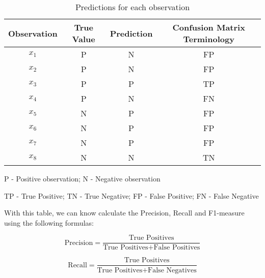 \documentclass[12pt]{article}
\begin{document}
\begin{enumerate}[leftmargin=\labelsep]
    \begin{table}[H]
        \begin{center}
            \begin{threeparttable}
            \begin{tabular}{c|c|c|c}
                Observation & True Value & Prediction & Confusion Matrix Terminology\\
                \hline
                $x_1$ & P & N & FP\\
                $x_2$ & P & N & FP\\
                $x_3$ & P & P & TP\\
                $x_4$ & P & N & FN\\
                $x_5$ & N & P & FP\\
                $x_6$ & N & P & FP\\
                $x_7$ & N & P & FP\\
                $x_8$ & N & N & TN\\
            \end{tabular}
            \begin{tablenotes}
                \small
                \item[]
                \item[P - Positive observation; N - Negative observation]  
                \item[TP - True Positive; TN - True Negative; FP - False Positive; FN - False Negative] 
                \item[] 
            \end{tablenotes}
        \end{threeparttable}
            \caption{Predictions for each observation}
        \end{center}
    \end{table}

    With this table, we can know calculate the Precision, Recall and F1-measure using the following formulas:

    \begin{equation}\label{precision}
        \text{Precision} = \frac{\text{True Positives}}{{\text{True Positives} +
        \text{False Positives}}}
    \end{equation}

    \begin{equation}\label{recall}
        \text{Recall} = \frac{\text{True Positives}}{{\text{True Positives} + \text{False Negatives}}}
    \end{equation}


\end{enumerate}
\end{document}
